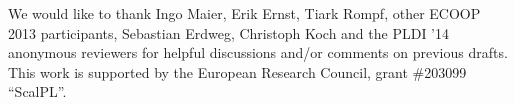 We would like to thank Ingo Maier, Erik Ernst,
Tiark Rompf, other ECOOP 2013 participants, Sebastian Erdweg, Christoph Koch and the PLDI '14
anonymous reviewers for helpful discussions and/or comments on
previous drafts.
This work is supported by the European Research Council, grant \#203099 ``ScalPL''.
